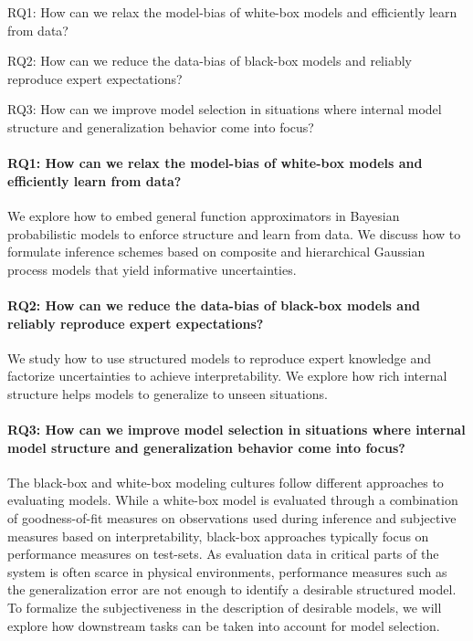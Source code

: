 \begin{RQs}
    \begin{compactdesc}
        \item[RQ1:] How can we relax the model-bias of white-box models and efficiently learn from data?
        \item[RQ2:] How can we reduce the data-bias of black-box models and reliably reproduce expert expectations?
        \item[RQ3:] How can we improve model selection in situations where internal model structure and generalization behavior come into focus?
    \end{compactdesc}
\end{RQs}

\paragraph{RQ1: How can we relax the model-bias of white-box models and efficiently learn from data?}
We explore how to embed general function approximators in Bayesian probabilistic models to enforce structure and learn from data.
We discuss how to formulate inference schemes based on composite and hierarchical Gaussian process models that yield informative uncertainties.

\paragraph{RQ2: How can we reduce the data-bias of black-box models and reliably reproduce expert expectations?}
We study how to use structured models to reproduce expert knowledge and factorize uncertainties to achieve interpretability.
We explore how rich internal structure helps models to generalize to unseen situations.

\paragraph{RQ3: How can we improve model selection in situations where internal model structure and generalization behavior come into focus?}
The black-box and white-box modeling cultures follow different approaches to evaluating models.
While a white-box model is evaluated through a combination of goodness-of-fit measures on observations used during inference and subjective measures based on interpretability, black-box approaches typically focus on performance measures on test-sets.
As evaluation data in critical parts of the system is often scarce in physical environments, performance measures such as the generalization error are not enough to identify a desirable structured model.
To formalize the subjectiveness in the description of desirable models, we will explore how downstream tasks can be taken into account for model selection.



